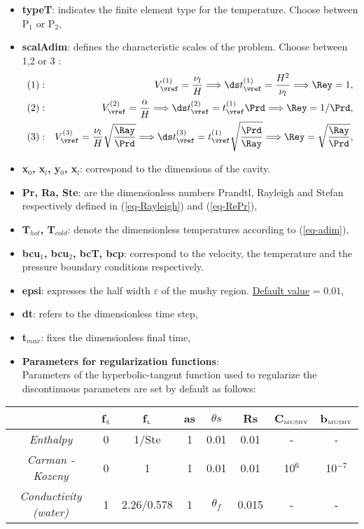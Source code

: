 \begin{itemize}
   \item {\bf typeT}: indicates the finite element type for the temperature. Choose between P$_1$ or P$_2$,
   \item {\bf scalAdim}: defines the characteristic scales of the problem. Choose between 1,2 or 3 \citep{dan-2014-JCP}:
   \begin{eqnarray} \label{eq-scal1}
    (1) &:&  V_\vref^{(1)} = \frac{\nu_l}{H} \Longrightarrow \ds t_\vref^{(1)} = \frac{H^2}{\nu_l}  \Longrightarrow \Rey=1,\\
      \label{eq-scal2}
     (2) &:& V_\vref^{(2)} = \frac{\alpha}{H} \Longrightarrow \ds t_\vref^{(2)} = t_\vref^{(1)} \Prd  \Longrightarrow \Rey =1/\Prd,\\
      \label{eq-scal3}
     (3) &:& V_\vref^{(3)} = \frac{\nu_l}{H} \sqrt{\frac{\Ray}{\Prd}} \Longrightarrow \ds t_\vref^{(3)} = t_\vref^{(1)} \sqrt{\frac{\Prd}{\Ray}}       \Longrightarrow \Rey = \sqrt{\frac{\Ray}{\Prd}},
\end{eqnarray}
   \item {\bf x$_0$, x$_l$, y$_0$, x$_l$}: correspond to the dimensions of the cavity.
   \item {\bf Pr, Ra, Ste}: are the dimensionless numbers Prandtl, Rayleigh and Stefan respectively defined in (\ref{eq-Rayleigh}) and (\ref{eq-RePr}),
   \item {\bf T$_{hot}$, T$_{cold}$}: denote the dimensionless temperatures according to (\ref{eq-adim}),
   \item{\bf bcu$_1$, bcu$_2$, bcT, bcp}: correspond to the velocity, the temperature and the pressure boundary conditions respectively.
   \item {\bf epsi}: expresses the half width $\varepsilon$ of the mushy region. \underline{Default value} = $0.01$,
   \item {\bf dt}: refers to the dimensionless time step,
   \item {\bf t$_{max}$}: fixes the dimensionless final time,
   \item {\bf Parameters for regularization functions}: \\
 Parameters of the hyperbolic-tangent function used to regularize the discontinuous parameters are set by default as follows:
 \end{itemize}
    \begin{table}[!ht]
    \centering
    \begin{tabular}{*{8}{c}}
     & {\bf f$_{{\hbox {\tiny S}}}$} & {\bf f$_{{\hbox {\tiny L}}}$} & {\bf as} & {\bf $\theta s$} & Rs & {\bf C$_{{\hbox {\tiny MUSHY}}}$} & {\bf b$_{{\hbox {\tiny MUSHY}}}$} \\
       \toprule
       {\it Enthalpy} & 0 & 1/Ste & 1 & 0.01 & 0.01  & - & - \\
       \midrule
       {\it Carman - Kozeny} & 0 & 1 & 1 & 0.01 & 0.01  & 10$^6$ & 10$^{-7}$ \\
          \midrule
       {\it Conductivity (water)} & 1 & 2.26/0.578 & 1 & $\theta_f$ & 0.015 & - & - \\
       \bottomrule
     \end{tabular}
    \label{tab-constant}
    \end{table}
